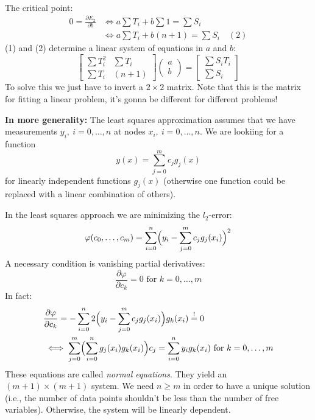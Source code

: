 \begin{example}
\begin{itemize}
{\begin{align*}
            \end{align*}
            The critical point:
            \begin{align*}
                0 = \frac{\partial E_2}{\partial b} 
                &\iff a \sum T_i + b \sum 1 = \sum S_i \\
                &\iff a \sum T_i + b(n + 1) = \sum S_i \quad (2)
            \end{align*}
            (1) and (2) determine a linear system of equations in $a$ and $b$:
            \[
                \begin{bmatrix}
                    \sum T_i^2 & \sum T_i\\
                    \sum T_i & (n + 1)
                \end{bmatrix}
                \begin{pmatrix}
                    a \\ b
                \end{pmatrix} = \begin{bmatrix}
                    \sum S_i T_i\\ \sum S_i
                \end{bmatrix}
            \]
            To solve this we just have to invert a $2 \times 2$ matrix.
            Note that this is the matrix for fitting a linear problem, it's 
            gonna be different for different problems!
        }
    \end{itemize}
\end{example}

\textbf{In more generality:}
The least squares approximation assumes that we have measurements $y_i,\ i = 0,\dots, n$
at nodes $x_i,\ i = 0,\dots, n$. We are lookiing for a function
\[
    y(x) = \sum_{j=0}^m c_j g_j(x)
\]
for linearly independent functions $g_j(x)$ (otherwise one function could be replaced
with a linear combination of others).

In the least squares approach we are minimizing the $l_2$-error:
\[
    \varphi(c_0, \dots, c_m) = \sum_{i = 0}^n \Bigl(
        y_i - \sum_{j=0}^m c_j g_j(x_i)
    \Bigr)^2
\]
A necessary condition is vanishing partial derivatives:
\[ \frac{\partial \varphi}{\partial c_k} = 0 \text{ for } k = 0, \dots, m\]
In fact:
\begin{align*}
    &\frac{\partial \varphi}{\partial c_k} =
    -\sum_{i=0}^n 2 \Bigl(y_i - \sum_{j=0}^m c_j g_j(x_i)\Bigr) g_k(x_i) \overset{!}{=} 0
    \\&\iff \sum_{j=0}^m \Bigl(
        \sum_{i=0}^n g_j(x_i) g_k(x_i)
    \Bigr) c_j = \sum_{i=0}^n y_i g_k(x_i)
    \text{ for } k = 0,\dots, m
\end{align*}
These equations are called \textit{normal equations}.
They yield an $(m + 1) \times (m + 1)$ system.
We need $n \ge m$ in order to have a unique solution (i.e.,
the number of data points shouldn't be less than the number of free variables).
Otherwise, the system will be linearly dependent.

